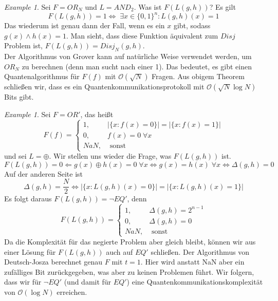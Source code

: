\documentclass[a4paper, 12pt]{article}
\theoremstyle{plain}
\theoremstyle{definition}
\theoremstyle{lemma}
\theoremstyle{remark}
\theoremstyle{example}
\newtheorem{example}[theorem]{Example}
\begin{document}
	\begin{example}
		Sei $F = OR_N$ und $L = AND_2$. Was ist $F(L(g,h))$? Es gilt \[F(L(g,h)) = 1 \Leftrightarrow \; \exists x \in \{0,1\}^n: L(g,h)(x) = 1\]
		Das wiederum ist genau dann der Fall, wenn es ein $x$ gibt, sodass $g(x)\land h(x) = 1$. Man sieht, dass diese Funktion äquivalent zum $Disj$ Problem ist, $F(L(g,h)) = Disj_N(g,h)$.\\
		Der Algorithmus von Grover kann auf natürliche Weise verwendet werden, um $OR_N$ zu berechnen (denn man sucht nach einer 1). Das bedeutet, es gibt einen Quantenalgorithmus für $F(f)$ mit $\mathcal{O}(\sqrt{N})$ Fragen. Aus obigem Theorem schließen wir, dass es ein Quantenkommunikationsprotokoll mit $\mathcal{O}(\sqrt{N}\log N)$ Bits gibt.
	\end{example}
	\begin{example}
		Sei $F=OR'$, das heißt \[F(f) = \begin{cases}
			1, & \left|\{x: f(x) = 0\}\right| = \left|\{x: f(x) = 1\}\right|\\
			0, & f(x) = 0\; \forall x\\
			NaN, & \text{ sonst}
		\end{cases}\] und sei $L=\oplus$. Wir stellen uns wieder die Frage, was $F(L(g,h))$ ist. \[F(L(g,h)) = 0 \Leftarrow g(x)\oplus h(x) = 0 \; \forall x \Leftrightarrow g(x)=h(x) \; \forall x \Leftrightarrow \Delta(g,h) = 0\] Auf der anderen Seite ist \[\Delta(g,h) = \frac{N}{2} \Leftrightarrow \left|\{x: L(g,h)(x) = 0\}\right| = \left|\{x: L(g,h)(x) = 1\}\right|\] Es folgt daraus $F(L(g,h)) = \lnot EQ'$, denn \[F(L(g,h)) = \begin{cases}
		1, & \Delta(g,h) = 2^{n-1}\\
		0, & \Delta(g,h) = 0\\
		NaN, & \text{ sonst}
	\end{cases}\]
	Da die Komplexität für das negierte Problem aber gleich bleibt, können wir aus einer Lösung für $F(L(g,h))$ auch auf $EQ'$ schließen. Der Algorithmus von Deutsch-Josza berechnet genau $F$ mit $t=1$. Hier wird anstatt NaN aber ein zufälliges Bit zurückgegeben, was aber zu keinen Problemen führt. Wir folgern, dass wir für $\lnot EQ'$ (und damit für $EQ'$) eine Quantenkommunikationskomplexität von $\mathcal{O}(\log N)$ erreichen.
	\end{example}
\end{document}
